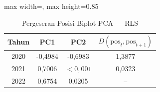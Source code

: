 \begin{table}[H]
\centering
\caption{Pergeseran Posisi Biplot PCA --- RLS} \label{tab:samplejarak_pca_loading_rls}
\begin{adjustbox}{max width=\textwidth, max height=0.85\textheight}
\begin{tabular}{|c|c|c|c|}
\hline
\textbf{Tahun} & \textbf{PC1} & \textbf{PC2} & \textbf{$D(\text{pos}_t, \text{pos}_{t+1})$} \\
\hline
2020 & -0,4984 & -0,6983 & 1,3877 \\
2021 & 0,7006 & $< 0,001$ & 0,0323 \\
2022 & 0,6754 & 0,0205 & -- \\
\hline
\end{tabular}
\end{adjustbox}
\end{table}